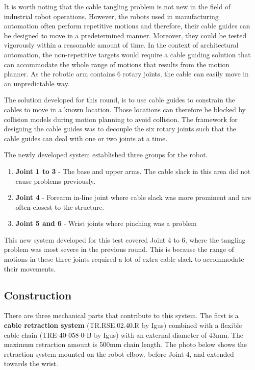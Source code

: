 \documentclass[11pt]{book}
\begin{document}
It is worth noting that the cable tangling problem is not new in the field of industrial robot operations. However, the robots used in manufacturing automation often perform repetitive motions and therefore, their cable guides can be designed to move in a predetermined manner. Moreover, they could be tested vigorously within a reasonable amount of time. In the context of architectural automation, the non-repetitive targets would require a cable guiding solution that can accommodate the whole range of motions that results from the motion planner. As the robotic arm contains 6 rotary joints, the cable can easily move in an unpredictable way.

The solution developed for this round, is to use cable guides to constrain the cables to move in a known location. Those locations can therefore be blocked by collision models during motion planning to avoid collision. The framework for designing the cable guides was to decouple the six rotary joints such that the cable guides can deal with one or two joints at a time. 

The newly developed system established three groups for the robot.

\begin{enumerate}
	\item \textbf{Joint 1 to 3 }- The base and upper arms. The cable slack in this area did not cause problems previously.

	\item \textbf{Joint 4 }- Forearm in-line joint where cable slack was more prominent and are often closest to the structure.

	\item \textbf{Joint 5 and 6 }- Wrist joints where pinching was a problem

\end{enumerate}
This new system developed for this test covered Joint 4 to 6, where the tangling problem was most severe in the previous round. This is because the range of motions in these three joints required a lot of extra cable slack to accommodate their movements. 

\subsection{Construction}

There are three mechanical parts that contribute to this system. The first is a \textbf{cable retraction system} (TR.RSE.02.40.R by Igus) combined with a flexible cable chain (TRE-40-058-0-B by Igus) with an external diameter of 43mm. The maximum retraction amount is 500mm chain length. The photo below shows the retraction system mounted on the robot elbow, before Joint 4, and extended towards the wrist.
\end{document}
